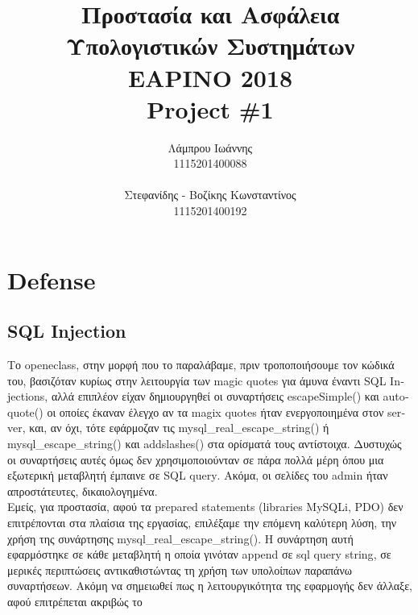 \documentclass{article}
\begin{document}
\title{\vspace{-3.5cm}\textbf{Προστασία και Ασφάλεια Υπολογιστικών Συστημάτων \\ΕΑΡΙΝΟ 2018\\ \textlatin{Project \#}1}}
\author{Λάμπρου Ιωάννης \\1115201400088\\\\ Στεφανίδης - Βοζίκης Κωνσταντίνος \\1115201400192}

\maketitle
\section*{\textlatin{Defense}}
\subsection*{\textlatin{SQL Injection}}
Το \textlatin{openeclass}, στην μορφή που το παραλάβαμε, πριν τροποποιήσουμε τον κώδικά του, 
βασιζόταν κυρίως στην λειτουργία των \textlatin{magic quotes} για άμυνα έναντι \textlatin{SQL Injections}, 
αλλά επιπλέον είχαν δημιουργηθεί οι συναρτήσεις \textlatin{escapeSimple()} και \textlatin{autoquote()} οι 
οποίες έκαναν έλεγχο αν τα \textlatin{magix quotes} ήταν ενεργοποιημένα στον \textlatin{server}, και, αν 
όχι, τότε εφάρμοζαν τις \textlatin{mysql\_real\_escape\_string()} ή \textlatin{mysql\_escape\_string()} και 
\textlatin{addslashes()} στα ορίσματά τους αντίστοιχα. Δυστυχώς οι συναρτήσεις αυτές όμως δεν 
χρησιμοποιούνταν σε πάρα πολλά μέρη όπου μια εξωτερική μεταβλητή 
έμπαινε σε \textlatin{SQL query}. Ακόμα, οι σελίδες του \textlatin{admin} ήταν απροστάτευτες, δικαιολογημένα.\\
Εμείς, για προστασία, αφού τα \textlatin{prepared statements (libraries MySQLi, PDO)} δεν επιτρέπονται στα 
πλαίσια της εργασίας, επιλέξαμε την επόμενη καλύτερη λύση, την χρήση της συνάρτησης 
\textlatin{mysql\_real\_escape\_string()}. 
Η συνάρτηση αυτή εφαρμόστηκε σε κάθε μεταβλητή η οποία γινόταν \textlatin{append} 
σε \textlatin{sql query string}, σε μερικές περιπτώσεις αντικαθιστώντας τη χρήση των υπολοίπων παραπάνω 
συναρτήσεων. Ακόμη να σημειωθεί πως η λειτουργικότητα της εφαρμογής δεν άλλαξε, αφού επιτρέπεται ακριβώς το  
\end{document}
